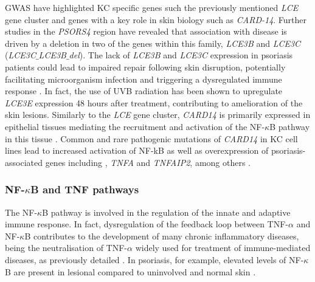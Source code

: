 GWAS have highlighted KC specific genes such the previously mentioned \textit{LCE} gene cluster and genes with a key role in skin biology such as \textit{CARD-14}. Further studies in the \textit{PSORS4} region have revealed that association with disease is driven by a deletion in two of the genes within this family, \textit{LCE3B} and \textit{LCE3C} (\textit{LCE3C$\_ $LCE3B$\_ $del})\parencite{Cid2009}. %
The lack of \textit{LCE3B} and \textit{LCE3C} expression in psoriasis patients could lead to impaired repair following skin disruption, potentially facilitating microorganism infection and triggering a dysregulated immune response \parencite{Bergboer2011}. In fact, the use of UVB radiation has been shown to upregulate \textit{LCE3E} expression 48 hours after treatment, contributing to amelioration of the skin lesions\parencite{Jackson2005}. %
Similarly to the \textit{LCE} gene cluster, \textit{CARD14} is primarily expressed in epithelial tissues mediating the recruitment and activation of the NF-$\kappa$B pathway in this tissue \parencite{Blonska2011}. Common and rare pathogenic mutations of \textit{CARD14} in KC cell lines lead to increased activation of NF-kB as well as overexpression of psoriasis-associated genes including , \textit{TNFA} and \textit{TNFAIP2}, among others \parencite{Jordan2012b}.



\subsubsection*{NF-$\kappa$B and TNF pathways}

The NF-$\kappa$B pathway is involved in the regulation of the innate and adaptive immune response. In fact, dysregulation of the feedback loop between TNF-$\alpha$ and NF-$\kappa$B contributes to the development of many chronic inflammatory diseases, being the neutralisation of TNF-$\alpha$ widely used for treatment of immune-mediated diseases, as previously detailed \parencite{Liu2017}. In psoriasis, for example, elevated levels of NF-$\kappa$B are present in lesional compared to uninvolved and normal skin \parencite{Lizzul2005}. 

